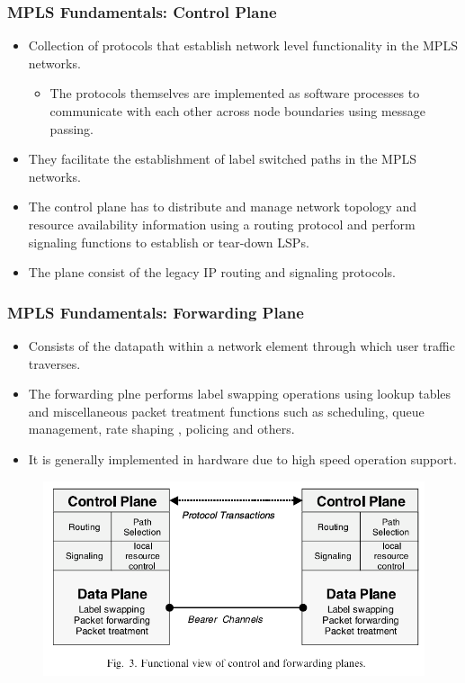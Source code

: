\documentclass[12pt]{beamer}
\begin{document}
\begin{frame}
	\frametitle{MPLS Fundamentals: Control Plane}
	\begin{itemize}
		\item Collection of protocols that establish network level functionality in the
		MPLS networks.
		\begin{itemize}
			\item The protocols themselves are implemented as software processes to communicate with each other across node boundaries using message passing.
		\end{itemize}
		\item They facilitate the establishment of label switched paths in the MPLS networks.
		\item The control plane has to distribute and manage network topology and resource availability information using a routing protocol and perform signaling functions to establish or tear-down LSPs.
		\item The plane consist of the legacy IP routing and signaling protocols.

	\end{itemize}
\end{frame}

\begin{frame}
	\frametitle{MPLS Fundamentals: Forwarding Plane}
	\begin{itemize}
		\item Consists of the datapath within a network element through which user traffic traverses.
		\item The forwarding plne performs label swapping operations using lookup tables and miscellaneous packet treatment functions such as scheduling, queue management, rate shaping , policing and others. 
		\item It is generally implemented in hardware due to high speed operation support.
	\end{itemize}
		\begin{figure}[h]
			\begin{center}
				\includegraphics[scale=0.37]{label.png}
			\end{center}
		\end{figure}	
	
\end{frame}
\end{document}
